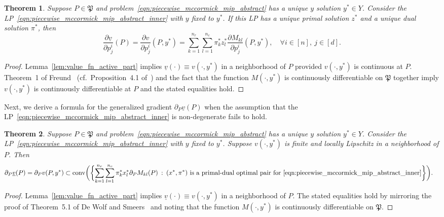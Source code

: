\documentclass{article}
\newtheorem{theorem}{Theorem}[]
\begin{document}
\begin{theorem}
\label{thm:smooth_case}
Suppose $P \in \mathfrak{P}$ and problem~\eqref{eqn:piecewise_mccormick_mip_abstract} has a unique $y$ solution $y^* \in Y$.
Consider the LP~\eqref{eqn:piecewise_mccormick_mip_abstract_inner} with $y$ fixed to $y^*$.
If this LP has a unique primal solution $z^*$ and a unique dual solution $\pi^*$, then
\[
\frac{\partial \underline{v}}{\partial p^i_j}(P) = \frac{\partial v}{\partial p^i_j}(P,y^*) = \sum_{k=1}^{n_r} \sum_{l=1}^{n_c} \pi^*_k z^*_l \frac{\partial M_{kl}}{\partial p^i_j}(P,y^*), \quad \forall i \in [n], \: j \in [d].
\]
\end{theorem}
\begin{proof}
Lemma~\ref{lem:value_fn_active_part} implies $\underline{v}(\cdot) \equiv v(\cdot,y^*)$ in a neighborhood of $P$ provided $v(\cdot,y^*)$ is continuous at $P$.
Theorem~1 of Freund~\cite{freund1985postoptimal} (cf.\ Proposition~4.1 of~\cite{de2021generalized}) and the fact that the function $M(\cdot,y^*)$ is continuously differentiable on $\mathfrak{P}$ together imply $v(\cdot,y^*)$ is continuously differentiable at $P$ and the stated equalities hold.
\end{proof}


Next, we derive a formula for the generalized gradient $\partial_P \underline{v}(P)$ when the assumption that the LP~\eqref{eqn:piecewise_mccormick_mip_abstract_inner} is non-degenerate fails to hold.



\begin{theorem}
\label{thm:nonsmooth_case}
Suppose $P \in \mathfrak{P}$ and problem~\eqref{eqn:piecewise_mccormick_mip_abstract} has a unique $y$ solution $y^* \in Y$.
Consider the LP~\eqref{eqn:piecewise_mccormick_mip_abstract_inner} with $y$ fixed to $y^*$.
Suppose $v(\cdot,y^*)$ is finite and locally Lipschitz in a neighborhood of $P$.
Then
\begin{align*}
\partial_P \underline{v}(P) &= \partial_P v(P,y^*) \subset \text{conv}\biggl(\biggl\{\sum_{k=1}^{n_r} \sum_{l=1}^{n_c} \pi^*_k x^*_l \partial_P M_{kl}(P) \: : \: (x^*,\pi^*) \text{ is a primal-dual optimal pair for } \eqref{eqn:piecewise_mccormick_mip_abstract_inner}\biggr\}\biggr).
\end{align*}
\end{theorem}
\begin{proof}
Lemma~\ref{lem:value_fn_active_part} implies $\underline{v}(\cdot) \equiv v(\cdot,y^*)$ in a neighborhood of $P$.
The stated equalities hold by mirroring the proof of Theorem~5.1 of De Wolf and Smeers~\cite{de2021generalized} and noting that the function $M(\cdot,y^*)$ is continuously differentiable on $\mathfrak{P}$.
\end{proof}
\end{document}
